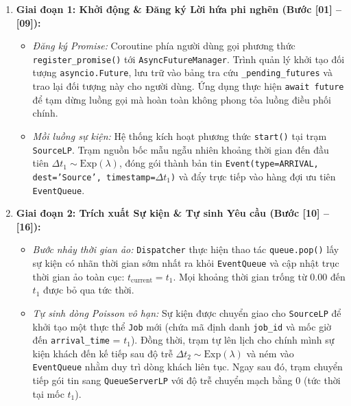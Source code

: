 \begin{enumerate}[leftmargin=2em, itemsep=6pt]
\item \textbf{Giai đoạn 1: Khởi động \& Đăng ký Lời hứa phi nghẽn (Bước [01] -- [09]):}
\begin{itemize}[leftmargin=1.5em, itemsep=2pt]
\item \textit{Đăng ký Promise:} Coroutine phía người dùng gọi phương thức \texttt{register\_promise()} tới \texttt{AsyncFutureManager}. Trình quản lý khởi tạo đối tượng \texttt{asyncio.Future}, lưu trữ vào bảng tra cứu \texttt{\_pending\_futures} và trao lại đối tượng này cho người dùng. Ứng dụng thực hiện \texttt{await future} để tạm dừng luồng gọi mà hoàn toàn không phong tỏa luồng điều phối chính.
\item \textit{Mồi luồng sự kiện:} Hệ thống kích hoạt phương thức \texttt{start()} tại trạm \texttt{SourceLP}. Trạm nguồn bốc mẫu ngẫu nhiên khoảng thời gian đến đầu tiên $\Delta t_1 \sim \text{Exp}(\lambda)$, đóng gói thành bản tin \texttt{Event(type=ARRIVAL, dest='Source', timestamp=$\Delta t_1$)} và đẩy trực tiếp vào hàng đợi ưu tiên \texttt{EventQueue}.
\end{itemize}

\item \textbf{Giai đoạn 2: Trích xuất Sự kiện \& Tự sinh Yêu cầu (Bước [10] -- [16]):}
\begin{itemize}[leftmargin=1.5em, itemsep=2pt]
\item \textit{Bước nhảy thời gian ảo:} \texttt{Dispatcher} thực hiện thao tác \texttt{queue.pop()} lấy sự kiện có nhãn thời gian sớm nhất ra khỏi \texttt{EventQueue} và cập nhật trục thời gian ảo toàn cục: $t_{\text{current}} = t_1$. Mọi khoảng thời gian trống từ $0.00$ đến $t_1$ được bỏ qua tức thời.
\item \textit{Tự sinh dòng Poisson vô hạn:} Sự kiện được chuyển giao cho \texttt{SourceLP} để khởi tạo một thực thể \texttt{Job} mới (chứa mã định danh \texttt{job\_id} và mốc giờ đến \texttt{arrival\_time} = $t_1$). Đồng thời, trạm tự lên lịch cho chính mình sự kiện khách đến kế tiếp sau độ trễ $\Delta t_2 \sim \text{Exp}(\lambda)$ và ném vào \texttt{EventQueue} nhằm duy trì dòng khách liên tục. Ngay sau đó, trạm chuyển tiếp gói tin sang \texttt{QueueServerLP} với độ trễ chuyển mạch bằng 0 (tức thời tại mốc $t_1$).
\end{itemize}


\end{enumerate}
